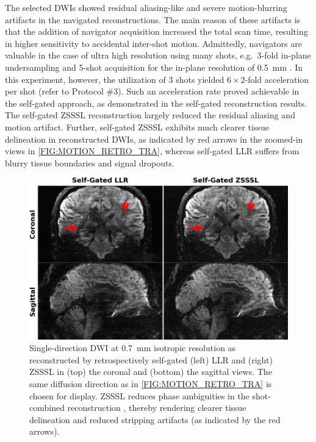 \documentclass[journal,twoside,web]{ieeecolor}
\begin{document}
	The selected DWIs showed residual aliasing-like and 
	severe motion-blurring artifacts
	in the navigated reconstructions.
	The main reason of these artifacts is that 
	the addition of navigator acquisition
	increased the total scan time,
	resulting in higher sensitivity to accidental inter-shot motion.
	Admittedly, navigators are valuable in the case of ultra high resolution
	using many shots, e.g.~3-fold in-plane undersampling and 5-shot acquisition
	for the in-plane resolution of 0.5~mm \cite{tan_2024_naviepi}.
	In this experiment, however, the utilization of 3 shots yielded
	$6 \times 2$-fold acceleration per shot (refer to Protocol \#3).
	Such an acceleration rate proved achievable in the self-gated approach,
	as demonstrated in the self-gated reconstruction results.
	The self-gated ZSSSL reconstruction largely reduced the residual aliasing
	and motion artifact. 
	Further, self-gated ZSSSL exhibits much clearer tissue delineation 
	in reconstructed DWIs, as indicated by red arrows in the zoomed-in views
	in \cref{FIG:MOTION_RETRO_TRA}, 
	whereas self-gated LLR suffers from 
	blurry tissue boundaries and signal dropouts.
	
	\begin{figure}
		\begin{minipage}[c]{0.75\textwidth}
			\includegraphics[width=\textwidth]{../figures/fig3.png}
		\end{minipage}\hfill
		\begin{minipage}[c]{0.23\textwidth}
			\caption{Single-direction DWI at 0.7~mm isotropic resolution 
				as reconstructed by retrospectively self-gated 
				(left) LLR and (right) ZSSSL 
				in (top) the coronal and (bottom) the sagittal views. 
				The same diffusion direction as in \cref{FIG:MOTION_RETRO_TRA}
				is chosen for display. 
				ZSSSL reduces phase ambiguities in the shot-combined reconstruction
				, thereby rendering clearer tissue delineation and 
				reduced stripping artifacts (as indicated by the red arrows).}
			\label{FIG:MOTION_RETRO_2}
		\end{minipage}
	\end{figure}
	
\end{document}
